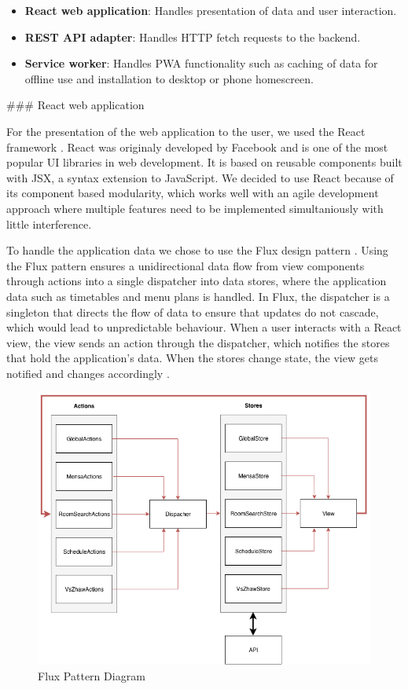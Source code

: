 \begin{markdown}
\begin{itemize}
  \item \textbf{React web application}: Handles presentation of data and user interaction.
  \item \textbf{REST API adapter}: Handles HTTP fetch requests to the backend.
  \item \textbf{Service worker}: Handles PWA functionality such as caching of data for offline use and installation to desktop or phone homescreen.
\end{itemize}

### React web application

For the presentation of the web application to the user, we used the React framework \cite{React}. React was originaly developed by Facebook and is one of the most popular UI libraries in web development. It is based on reusable components built with JSX, a syntax extension to JavaScript. We decided to use React because of its component based modularity, which works well with an agile development approach where multiple features need to be implemented simultaniously with little interference.

To handle the application data we chose to use the Flux design pattern \cite{Flux}. Using the Flux pattern ensures a unidirectional data flow from view components through actions into a single dispatcher into data stores, where the application data such as timetables and menu plans is handled. In Flux, the dispatcher is a singleton that directs the flow of data to ensure that updates do not cascade, which would lead to unpredictable behaviour. When a user interacts with a React view, the view sends an action through the dispatcher, which notifies the stores that hold the application’s data. When the stores change state, the view gets notified and changes accordingly \cite{Flux}.

\bigskip

\begin{figure}[H]
  \includegraphics[width=11.3cm, center]{../../diagrams/flux.png}
  \caption{\textsf{Flux Pattern Diagram}}
\end{figure}


\end{markdown}
